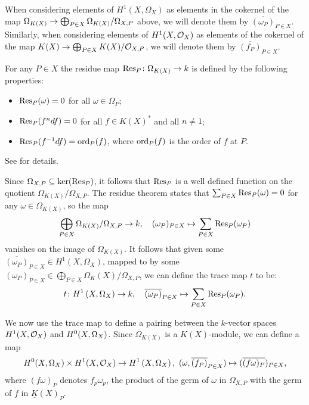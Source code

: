     \begin{rem}
        When considering elements of $H^1(X,\Omega_X)$ as elements in the cokernel of the map $\Omega_{K(X)} \rightarrow \bigoplus_{P \in X}\Omega_{K(X)}/\Omega_{X,P}$ above, we will denote them by $\overline{(\omega_P)}_{P \in X}$.
        Similarly, when considering elements of $H^1(X,\mathcal{O}_X)$ as elements of the cokernel of the map $K(X) \rightarrow \bigoplus_{P \in X}K(X)/{\cal O}_{X,P}$, we will denote them by $\overline{(f_P)}_{P \in X}$.
    \end{rem}

For any $P\in X$ the residue map $\operatorname{Res}_P \colon \Omega_{K(X)} \rightarrow k$ is defined by the following properties:
    \begin{itemize}
        \item $\operatorname{Res}_P(\omega) = 0$ for all $\omega \in \Omega_{P}$;
        \item $\operatorname{Res}_P(f^ndf) = 0$ for all $f \in K(X)^*$ and all $n \neq 1$;
        \item $\operatorname{Res}_P(f^{-1}df) = \operatorname{ord}_P(f)$, where $\operatorname{ord}_P(f)$ is the order of $f$ at $P$.
    \end{itemize}
See \cite[Chap. III, Thm. 7.14.1]{hart} for details.



Since $\Omega_{X,P} \subseteq \ker (\operatorname{Res}_P)$, it follows that $\operatorname{Res}_P$ is a well defined function on the quotient $\Omega_{K(X)}/\Omega_{X,P}$.
The residue theorem \cite[Chap. III, Thm. 7.14.2]{hart} states that $\sum_{P\in X} \operatorname{Res}_P(\omega) = 0$ for any $\omega \in \Omega_{K(X)}$, so the map 
    \begin{equation*} 
    \bigoplus_{P \in X} \Omega_{K(X)}/\Omega_{X,P} \rightarrow k, \quad (\omega_P)_{P \in X} \mapsto \sum_{P\in X} \operatorname{Res}_P(\omega_P)
    \end{equation*} 
vanishes on the image of $\Omega_{K(X)}$.
It follows that given some $\overline{(\omega_P)}_{P \in X} \in H^1(X,\Omega_X)$, mapped to by some $(\omega_P)_{P \in X} \in \bigoplus_{P \in X} \Omega_K(X)/\Omega_{X,P}$, we can define the trace map $t$ to be:
    \[
    t \colon H^1\left(X, \Omega_X\right) \rightarrow k,\quad \overline{(\omega_P)}_{P \in X}  \mapsto \sum_{P \in X} \operatorname{Res}_P(\omega_P).
    \]


We now use the trace map to define a pairing between the $k$-vector spaces $H^1(X,\mathcal{O}_X)$ and ${H^0(X,\Omega_X)}$.
Since $\Omega_{K(X)}$ is a $K(X)$-module, we can define a map 
    \begin{equation}\label{productmap}
    {H^0(X,\Omega_X)} \times H^1(X,\mathcal{O}_X) \rightarrow H^1\left(X, \Omega_X\right), \ (\omega, \overline{(f_P)}_{P \in X}) \mapsto ( \overline {(f  \omega)_P})_{P \in X},
    \end{equation}
where $(f\omega)_P$ denotes $f_p\omega_p$, the product of the germ of $\omega$ in $\Omega_{X,P}$ with the germ of $f$ in $\underline{K}(X)_{P}$.

